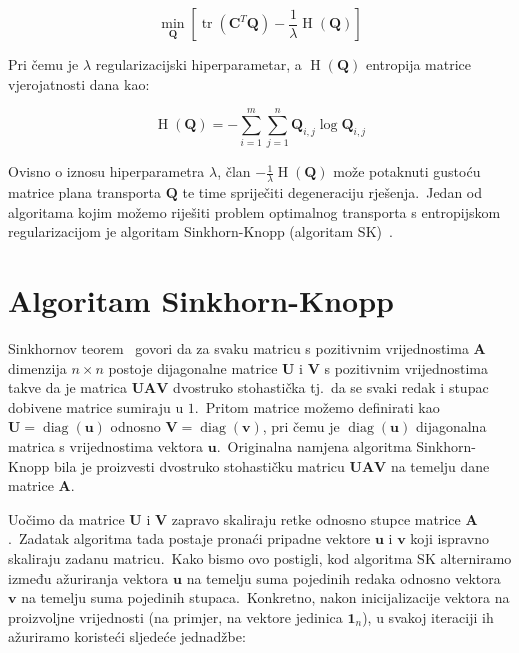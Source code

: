 \documentclass[diplomskirad]{fer}
\begin{document}
\begin{equation}
  \min_{\bm{Q}} \left[ \operatorname{tr}(\bm{C}^T \bm{Q}) - \frac{1}{\lambda} \operatorname{H}(\bm{Q}) \right]
  \label{eq:ot_with_entropy}
\end{equation}

Pri čemu je $\lambda$ regularizacijski hiperparametar, a $\operatorname{H}(\bm{Q})$ entropija matrice vjerojatnosti dana kao:

\begin{equation}
  \operatorname{H}(\bm{Q}) = -\sum_{i = 1}^{m} \sum_{j = 1}^{n} \bm{Q}_{i,j} \log \bm{Q}_{i,j}
  \label{eq:ot_with_entropy}
\end{equation}

Ovisno o iznosu hiperparametra $\lambda$, član $- \frac{1}{\lambda} \operatorname{H}(\bm{Q})$ može potaknuti gustoću matrice plana transporta $\bm{Q}$ te time spriječiti degeneraciju rješenja.\
Jedan od algoritama kojim možemo riješiti problem optimalnog transporta s entropijskom regularizacijom je algoritam Sinkhorn-Knopp (algoritam SK)~\cite{knight2008sinkhorn}.\ 

\section{Algoritam Sinkhorn-Knopp}
\label{sek:sk_alg}

Sinkhornov teorem~\cite{sinkhorn1964relationship} govori da za svaku matricu s pozitivnim vrijednostima $\bm{A}$ dimenzija $n \times n$ postoje dijagonalne matrice $\bm{U}$ i $\bm{V}$ s pozitivnim vrijednostima takve da je matrica $\bm{U} \bm{A} \bm{V}$ dvostruko stohastička tj.\ da se svaki redak i stupac dobivene matrice sumiraju u $1$.\ 
Pritom matrice možemo definirati kao $\bm{U} = \operatorname{diag}(\bm{u})$ odnosno $\bm{V} = \operatorname{diag}(\bm{v})$, pri čemu je $\operatorname{diag}(\bm{u})$ dijagonalna matrica s vrijednostima vektora $\bm{u}$.\ 
Originalna namjena algoritma Sinkhorn-Knopp bila je proizvesti dvostruko stohastičku matricu $\bm{U} \bm{A} \bm{V}$ na temelju dane matrice $\bm{A}$.\ 
  
Uočimo da matrice $\bm{U}$ i $\bm{V}$ zapravo skaliraju retke odnosno stupce matrice $\bm{A}$.\ Zadatak algoritma tada postaje pronaći pripadne vektore $\bm{u}$ i $\bm{v}$ koji ispravno skaliraju zadanu matricu.\ 
Kako bismo ovo postigli, kod algoritma SK alterniramo između ažuriranja vektora $\bm{u}$ na temelju suma pojedinih redaka odnosno vektora $\bm{v}$ na temelju suma pojedinih stupaca.\
Konkretno, nakon inicijalizacije vektora na proizvoljne vrijednosti (na primjer, na vektore jedinica $\bm{1}_n$), u svakoj iteraciji ih ažuriramo koristeći sljedeće jednadžbe:
\end{document}
